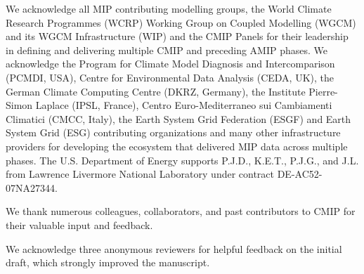 \documentclass[gmd, preprint]{copernicus}
\begin{document}
\begin{acknowledgements}

We acknowledge all MIP contributing modelling groups, the World Climate Research Programmes (WCRP) Working Group on Coupled Modelling (WGCM) and its WGCM Infrastructure (WIP) and the CMIP Panels for their leadership in defining and delivering multiple CMIP and preceding AMIP phases. We acknowledge the Program for Climate Model Diagnosis and Intercomparison (PCMDI, USA), Centre for Environmental Data Analysis (CEDA, UK), the German Climate Computing Centre (DKRZ, Germany), the Institute Pierre-Simon Laplace (IPSL, France), Centro Euro-Mediterraneo sui Cambiamenti Climatici (CMCC, Italy), the Earth System Grid Federation (ESGF) and Earth System Grid (ESG) contributing organizations and many other infrastructure providers for developing the ecosystem that delivered MIP data across multiple phases. The U.S. Department of Energy supports P.J.D., K.E.T., P.J.G., and J.L. from Lawrence Livermore National Laboratory under contract DE-AC52-07NA27344.

We thank numerous colleagues, collaborators, and past contributors to CMIP for their valuable input and feedback.

We acknowledge three anonymous reviewers for helpful feedback on the initial draft, which strongly improved the manuscript.
\end{acknowledgements}









\end{document}
